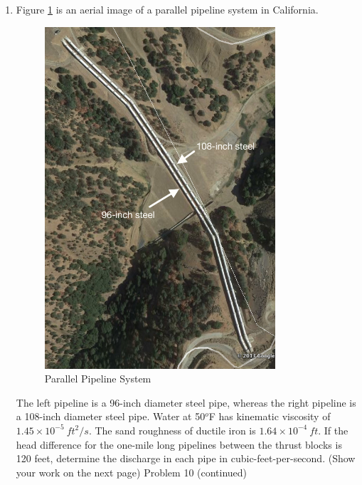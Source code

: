 \documentclass[11pt]{article}
\begin{document}
\begin{enumerate}
\clearpage
\item Figure \ref{fig:parallelpipes} is an aerial image of a parallel pipeline system in California.   

\begin{figure}[htbp] %
   \centering
   \includegraphics[height=5in]{parallelpipes.jpg} 
   \caption{Parallel Pipeline System}
   \label{fig:parallelpipes}
\end{figure}

The left pipeline is a 96-inch diameter steel pipe, whereas the right pipeline is a 108-inch diameter steel pipe.  
Water at 50$^o$F has kinematic viscosity of $1.45\times10^{-5}~ft^2/s$.   
The sand roughness of ductile iron is $1.64\times10^{-4}~ft$.   
If the head difference for the one-mile long pipelines between the thrust blocks is 120 feet, determine the discharge in each pipe in cubic-feet-per-second.
(Show your work on the next page)
\clearpage
Problem 10 (continued)
\clearpage


\end{enumerate}
\end{document}
